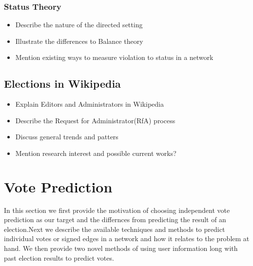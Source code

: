 \subsection{Status Theory}
\begin{itemize}
    \item Describe the nature of the directed setting
    \item Illustrate the differences to Balance theory
    \item Mention existing ways to measure violation to status in a network
\end{itemize}

\section{Elections in Wikipedia}
\begin{itemize}
    \item Explain Editors and Administrators in Wikipedia
    \item Describe the Request for Administrator(RfA) process
    \item Discuss general trends and patters
    \item Mention research interest and possible current works?
\end{itemize}

\chapter{Vote Prediction}
In this section we first provide the motivation of choosing independent vote prediction as our target and the differnces from predicting the result of an election.Next we describe the available techniques and methods to predict individual votes or signed edges in a network and how it relates to the problem at hand. We then provide two novel methods of using user information long with past election results to predict votes.

